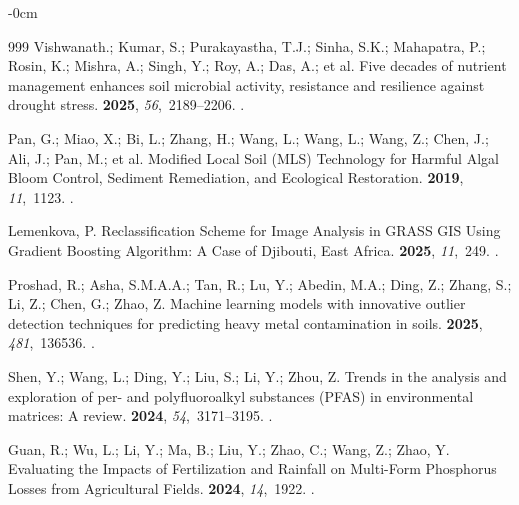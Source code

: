 \documentclass[environremediat,article,accept,pdftex,oneauthor]{Definitions/mdpi}
\begin{document}
\begin{adjustwidth}{-\extralength}{0cm}
\begin{thebibliography}{999}
Vishwanath.; Kumar, S.; Purakayastha, T.J.; Sinha, S.K.; Mahapatra, P.; Rosin, K.; Mishra, A.; Singh, Y.; Roy, A.; Das, A.; et al. %
\newblock Five decades of nutrient management enhances soil microbial activity,
  resistance and resilience against drought stress.
 {\bf 2025},
  {\em 56},~2189--2206.
.

Pan, G.; Miao, X.; Bi, L.;  Zhang, H.; Wang, L.; Wang, L.; Wang, Z.; Chen, J.; Ali, J.; Pan, M.; et al.
\newblock Modified Local Soil (MLS) Technology for Harmful Algal Bloom Control,
  Sediment Remediation, and Ecological Restoration.
 {\bf 2019}, {\em 11},~1123.
.

Lemenkova, P.
\newblock Reclassification Scheme for Image Analysis in GRASS GIS Using
  Gradient Boosting Algorithm: A Case of Djibouti, East Africa.
 {\bf 2025}, {\em 11},~249.
.

Proshad, R.; Asha, S.M.A.A.; Tan, R.;  Lu, Y.; Abedin, M.A.; Ding, Z.; Zhang, S.; Li, Z.; Chen, G.; Zhao, Z.
\newblock Machine learning models with innovative outlier detection techniques
  for predicting heavy metal contamination in soils.
 {\bf 2025}, {\em 481},~136536.
.

Shen, Y.; Wang, L.; Ding, Y.; Liu, S.; Li, Y.; Zhou, Z.
\newblock Trends in the analysis and exploration of per- and polyfluoroalkyl
  substances (PFAS) in environmental matrices: A review.
 {\bf 2024}, {\em
  54},~3171--3195.
.

Guan, R.; Wu, L.; Li, Y.; Ma, B.; Liu, Y.; Zhao, C.; Wang, Z.; Zhao, Y. 
\newblock Evaluating the Impacts of Fertilization and Rainfall on Multi-Form
  Phosphorus Losses from Agricultural Fields.
 {\bf 2024}, {\em 14},~1922.
.


\end{thebibliography}
\end{adjustwidth}
\end{document}
